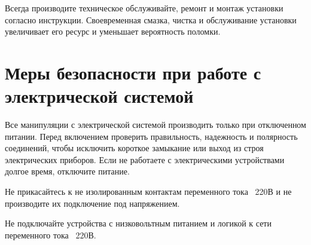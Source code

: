 Всегда производите техническое обслуживайте, ремонт и монтаж установки согласно инструкции. Своевременная смазка, чистка и обслуживание установки увеличивает его ресурс и уменьшает вероятность поломки.

\section{Меры безопасности при работе с электрической системой}
Все манипуляции с электрической системой производить только при отключенном питании. Перед включением проверить правильность, надежность и полярность соединений, чтобы исключить короткое замыкание или выход из строя электрических приборов. Если не работаете с электрическими устройствами долгое время, отключите питание.

Не прикасайтесь к не изолированным контактам переменного тока ~220В и не производите их подключение под напряжением.

Не подключайте устройства с низковольтным питанием и логикой к сети переменного тока ~220В.